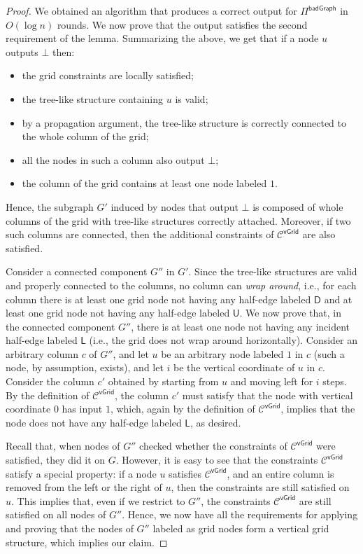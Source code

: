 \documentclass[11pt]{article}
\newcommand{\lleft}{\mathsf {L}}
\newcommand{\lup}{\mathsf {U}}
\newcommand{\ldown}{\mathsf {D}}
\newcommand{\lvgrid}{\mathsf {vGrid}}
\newcommand{\lbadgraph}{\mathsf {badGraph}}
\begin{document}
\begin{proof}
	We obtained an algorithm that produces a correct output for $\Pi^{\lbadgraph}$ in $O(\log n)$ rounds. We now prove that the output satisfies the second requirement of the lemma.
	Summarizing the above, we get that if a node $u$ outputs $\bot$ then:
	\begin{itemize}[noitemsep]
		\item the grid constraints are locally satisfied;
		\item the tree-like structure containing $u$ is valid;
		\item by a propagation argument, the tree-like structure is correctly connected to the whole column of the grid;
		\item all the nodes in such a column also output $\bot$;
		\item the column of the grid contains at least one node labeled $1$.
	\end{itemize} 
	Hence, the subgraph $G'$ induced by nodes that output $\bot$ is composed of whole columns of the grid with tree-like structures correctly attached. Moreover, if two such columns are connected, then the additional constraints of $\mathcal{C}^{\lvgrid}$ are also satisfied.
	
	Consider a connected component $G''$ in $G'$. Since the tree-like structures are valid and properly connected to the columns, no column can \emph{wrap around}, i.e., for each column there is at least one grid node not having any half-edge labeled $\ldown$ and at least one grid node not having any half-edge labeled $\lup$. We now prove that, in the connected component $G''$, there is at least one node not having any incident half-edge labeled $\lleft$ (i.e., the grid does not wrap around horizontally). Consider an arbitrary column $c$ of $G''$, and let $u$ be an arbitrary node labeled $1$ in $c$ (such a node, by assumption, exists), and let $i$ be the vertical coordinate of $u$ in $c$. Consider the column $c'$ obtained by starting from $u$ and moving left for $i$ steps. By the definition of $\mathcal{C}^{\lvgrid}$, the column $c'$ must satisfy that the node with vertical coordinate $0$ has input $1$, which, again by the definition of $\mathcal{C}^{\lvgrid}$, implies that the node does not have any half-edge labeled $\lleft$, as desired.
	
	Recall that, when nodes of $G''$ checked whether the constraints of $\mathcal{C}^{\lvgrid}$ were satisfied, they did it on $G$. However, it is easy to see that the constraints $\mathcal{C}^{\lvgrid}$ satisfy a special property: if a node $u$ satisfies $\mathcal{C}^{\lvgrid}$, and an entire column is removed from the left or the right of $u$, then the constraints are still satisfied on $u$. This implies that, even if we restrict to $G''$, the constraints $\mathcal{C}^{\lvgrid}$ are still satisfied on all nodes of $G''$. Hence, we now have all the requirements for applying  and proving that the nodes of $G''$ labeled as grid nodes form a vertical grid structure, which implies our claim.
\end{proof}
\end{document}
